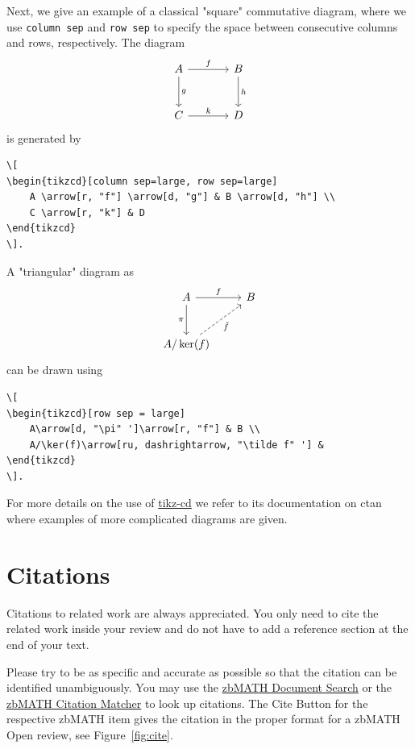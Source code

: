 \documentclass{zbMATH}
\begin{document}
Next, we give an example of a classical "square" commutative diagram, where we use \verb|column sep| and \verb|row sep| to specify the space between consecutive columns and rows, respectively. The diagram
\[
\begin{tikzcd}[column sep=large, row sep=large]
    A \arrow[r, "f"] \arrow[d, "g"] & B \arrow[d, "h"]\\
    C \arrow[r, "k"]& D
\end{tikzcd}
\]
is generated by
\begin{verbatim}
\[
\begin{tikzcd}[column sep=large, row sep=large]
    A \arrow[r, "f"] \arrow[d, "g"] & B \arrow[d, "h"] \\
    C \arrow[r, "k"] & D
\end{tikzcd}
\].
\end{verbatim}

A "triangular" diagram as
\[
\begin{tikzcd}[row sep = large]
    A\arrow[d, "\pi" ']\arrow[r, "f"] & B \\
    A/\ker(f)\arrow[ru, dashrightarrow, "\tilde f" '] &
\end{tikzcd}
\]
can be drawn using
\begin{verbatim}
\[
\begin{tikzcd}[row sep = large]
    A\arrow[d, "\pi" ']\arrow[r, "f"] & B \\
    A/\ker(f)\arrow[ru, dashrightarrow, "\tilde f" '] &
\end{tikzcd}
\].
\end{verbatim}

For more details on the use of \href{https://ctan.org/pkg/tikz-cd}{tikz-cd} we refer to its documentation on ctan where examples of more complicated diagrams are given.

\section*{Citations}

Citations to related work are always appreciated. You only need to cite the related work inside your review and do not have to add a reference section at the end of your text.

Please try to be as specific and accurate as possible so that the citation can be identified unambiguously. You  may use the \href{https://zbmath.org/}{zbMATH Document Search} or the \href{https://zbmath.org/citationmatching/}{zbMATH Citation Matcher} to look up citations. The Cite Button for the respective zbMATH item gives the citation in the proper format for a zbMATH Open review, see Figure~\ref{fig:cite}.
\end{document}
